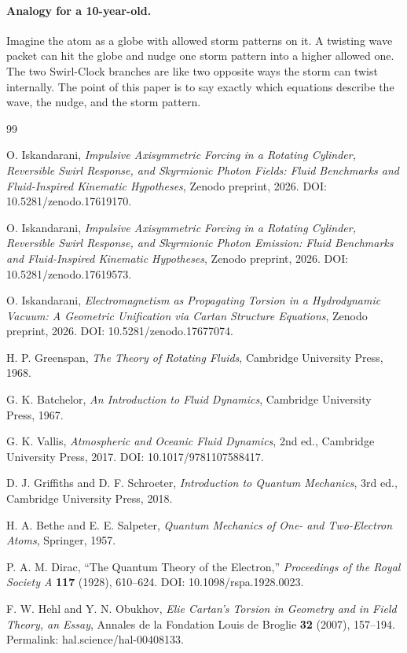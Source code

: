 \documentclass[11pt,a4paper]{article}
\begin{document}
\paragraph{Analogy for a 10-year-old.} Imagine the atom as a globe with allowed storm patterns on it. A twisting wave packet can hit the globe and nudge one storm pattern into a higher allowed one. The two Swirl-Clock branches are like two opposite ways the storm can twist internally. The point of this paper is to say exactly which equations describe the wave, the nudge, and the storm pattern.

\begin{thebibliography}{99}

O. Iskandarani,
\textit{Impulsive Axisymmetric Forcing in a Rotating Cylinder, Reversible Swirl Response, and Skyrmionic Photon Fields: Fluid Benchmarks and Fluid-Inspired Kinematic Hypotheses},
Zenodo preprint, 2026.
DOI: 10.5281/zenodo.17619170.

O. Iskandarani,
\textit{Impulsive Axisymmetric Forcing in a Rotating Cylinder, Reversible Swirl Response, and Skyrmionic Photon Emission: Fluid Benchmarks and Fluid-Inspired Kinematic Hypotheses},
Zenodo preprint, 2026.
DOI: 10.5281/zenodo.17619573.

O. Iskandarani,
\textit{Electromagnetism as Propagating Torsion in a Hydrodynamic Vacuum: A Geometric Unification via Cartan Structure Equations},
Zenodo preprint, 2026.
DOI: 10.5281/zenodo.17677074.

H. P. Greenspan,
\textit{The Theory of Rotating Fluids},
Cambridge University Press, 1968.

G. K. Batchelor,
\textit{An Introduction to Fluid Dynamics},
Cambridge University Press, 1967.

G. K. Vallis,
\textit{Atmospheric and Oceanic Fluid Dynamics},
2nd ed., Cambridge University Press, 2017.
DOI: 10.1017/9781107588417.

D. J. Griffiths and D. F. Schroeter,
\textit{Introduction to Quantum Mechanics},
3rd ed., Cambridge University Press, 2018.

H. A. Bethe and E. E. Salpeter,
\textit{Quantum Mechanics of One- and Two-Electron Atoms},
Springer, 1957.

P. A. M. Dirac,
``The Quantum Theory of the Electron,''
\textit{Proceedings of the Royal Society A} \textbf{117} (1928), 610--624.
DOI: 10.1098/rspa.1928.0023.

F. W. Hehl and Y. N. Obukhov,
\textit{Elie Cartan's Torsion in Geometry and in Field Theory, an Essay},
Annales de la Fondation Louis de Broglie \textbf{32} (2007), 157--194.
Permalink: hal.science/hal-00408133.

\end{thebibliography}
\end{document}
